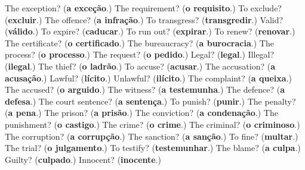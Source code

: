 \begin{tcolorbox}[breakable,colback=teal!4,colframe=teal!35!black,title={Before you move on}]
The exception? (\textbf{a exceção}.) The requirement? (\textbf{o requisito}.) To exclude? (\textbf{excluir}.) The offence? (\textbf{a infração}.) To transgress? (\textbf{transgredir}.) Valid? (\textbf{válido}.) To expire? (\textbf{caducar}.) To run out? (\textbf{expirar}.) To renew? (\textbf{renovar}.) The certificate? (\textbf{o certificado}.) The bureaucracy? (\textbf{a burocracia}.) The process? (\textbf{o processo}.) The request? (\textbf{o pedido}.) Legal? (\textbf{legal}.) Illegal? (\textbf{ilegal}.) The thief? (\textbf{o ladrão}.) To accuse? (\textbf{acusar}.) The accusation? (\textbf{a acusação}.) Lawful? (\textbf{lícito}.) Unlawful? (\textbf{ilícito}.) The complaint? (\textbf{a queixa}.) The accused? (\textbf{o arguido}.) The witness? (\textbf{a testemunha}.) The defence? (\textbf{a defesa}.) The court sentence? (\textbf{a sentença}.) To punish? (\textbf{punir}.) The penalty? (\textbf{a pena}.) The prison? (\textbf{a prisão}.) The conviction? (\textbf{a condenação}.) The punishment? (\textbf{o castigo}.) The crime? (\textbf{o crime}.) The criminal? (\textbf{o criminoso}.) The corruption? (\textbf{a corrupção}.) The sanction? (\textbf{a sanção}.) To fine? (\textbf{multar}.) The trial? (\textbf{o julgamento}.) To testify? (\textbf{testemunhar}.) The blame? (\textbf{a culpa}.) Guilty? (\textbf{culpado}.) Innocent? (\textbf{inocente}.)
\end{tcolorbox}
